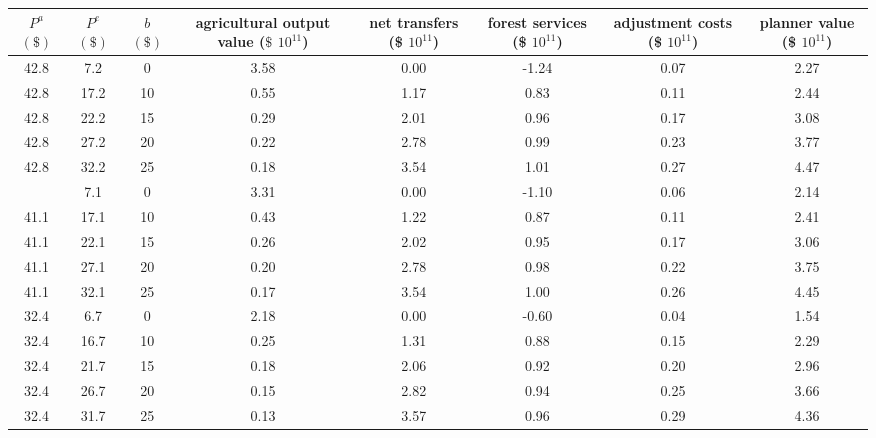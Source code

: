 
\begin{tabular}[t]{cccccccc}
\toprule
\makecell[c]{$P^a$ \\ $(\$)$} & \makecell[c]{$P^e$ \\ $(\$)$} & \makecell[c]{$b$ \\ $(\$)$} & \makecell[c]{agricultural \\ output value \\ ($\$$ $10^{11}$)} & \makecell[c]{net \\ transfers \\ (\$ $10^{11}$)} & \makecell[c]{forest \\ services \\ (\$ $10^{11}$)} & \makecell[c]{adjustment \\ costs \\ (\$ $10^{11}$)} & \makecell[c]{planner \\ value \\ (\$ $10^{11}$)}\\
\midrule

42.8 &  7.2 &  0 &      3.58 &      0.00 &     -1.24 &      0.07 &      2.27 \\
42.8 & 17.2 & 10 &      0.55 &      1.17 &      0.83 &      0.11 &      2.44 \\
42.8 & 22.2 & 15 &      0.29 &      2.01 &      0.96 &      0.17 &      3.08 \\
42.8 & 27.2 & 20 &      0.22 &      2.78 &      0.99 &      0.23 &      3.77 \\
42.8 & 32.2 & 25 &      0.18 &      3.54 &      1.01 &      0.27 &      4.47 \\
\addlinespace
41.1 &  7.1 &  0 &  3.31 &  0.00 & -1.10 &  0.06 &  2.14 \\
41.1 & 17.1 & 10 &  0.43 &  1.22 &  0.87 &  0.11 &  2.41 \\
41.1 & 22.1 & 15 &  0.26 &  2.02 &  0.95 &  0.17 &  3.06 \\
41.1 & 27.1 & 20 &  0.20 &  2.78 &  0.98 &  0.22 &  3.75 \\
41.1 & 32.1 & 25 &  0.17 &  3.54 &  1.00 &  0.26 &  4.45 \\
\addlinespace

32.4 &  6.7 &  0 &      2.18 &      0.00 &     -0.60 &      0.04 &      1.54 \\
32.4 & 16.7 & 10 &      0.25 &      1.31 &      0.88 &      0.15 &      2.29 \\
32.4 & 21.7 & 15 &      0.18 &      2.06 &      0.92 &      0.20 &      2.96 \\
32.4 & 26.7 & 20 &      0.15 &      2.82 &      0.94 &      0.25 &      3.66 \\
32.4 & 31.7 & 25 &      0.13 &      3.57 &      0.96 &      0.29 &      4.36 \\
\bottomrule
\end{tabular}

